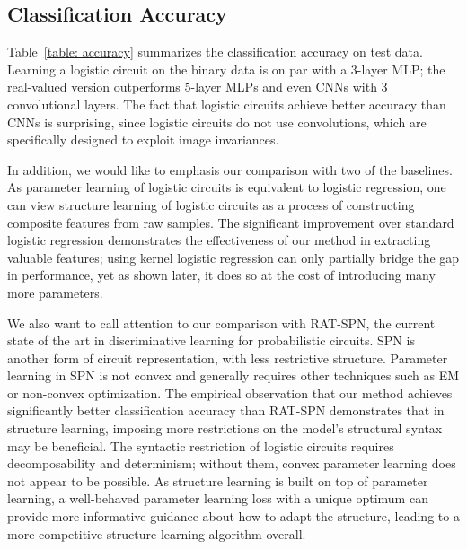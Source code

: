 \documentclass[letterpaper]{article} %
\begin{document}
\subsection{Classification Accuracy}
\label{s: classification accuracy}
Table~\ref{table: accuracy} summarizes the classification accuracy on test data. Learning a logistic circuit on the binary data is on par with a 3-layer MLP; the real-valued version outperforms 5-layer MLPs and even CNNs with 3 convolutional layers. The fact that logistic circuits achieve better accuracy than CNNs is surprising, since logistic circuits do not use convolutions, which are specifically designed to exploit image invariances.

In addition, we would like to emphasis our comparison with two of the baselines. As parameter learning of logistic circuits is equivalent to logistic regression, one can view structure learning of logistic circuits as a process of constructing composite features from raw samples.
The significant improvement over standard logistic regression demonstrates the effectiveness of our method in extracting valuable features; using kernel logistic regression can only partially bridge the gap in performance, yet as shown later, it does so at the cost of introducing many more parameters.

We also want to call attention to our comparison with RAT-SPN, the current state of the art in discriminative learning for probabilistic circuits. SPN is another form of circuit representation, with less restrictive structure. Parameter learning in SPN is not convex and generally requires other techniques such as EM or non-convex optimization. The empirical observation that our method achieves significantly better classification accuracy than RAT-SPN demonstrates that in structure learning, imposing more restrictions on the model's structural syntax may be beneficial. The syntactic restriction of logistic circuits requires decomposability and determinism; without them, convex parameter learning does not appear to be possible.
As structure learning is built on top of parameter learning, a well-behaved parameter learning loss with a unique optimum can provide more informative guidance about how to adapt the structure, leading to a more competitive structure learning algorithm overall.
\end{document}
